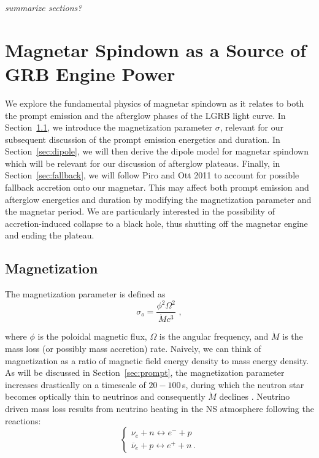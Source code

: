 \documentclass{article}
\begin{document}
\textit{summarize sections?}

\section{Magnetar Spindown as a Source of GRB Engine Power} 
We explore the fundamental physics of magnetar spindown as it relates to both the prompt emission and the afterglow phases of the LGRB light curve. In Section~\ref{sec:magnetization}, we introduce the magnetization parameter $\sigma$, relevant for our subsequent discussion of the prompt emission energetics and duration. In Section~\ref{sec:dipole}, we will then derive the dipole model for magnetar spindown which will be relevant for our discussion of afterglow plateaus. Finally, in Section~\ref{sec:fallback}, we will follow Piro and Ott 2011 \cite{Piro:2011ed} to account for possible fallback accretion onto our magnetar. This may affect both prompt emission and afterglow energetics and duration by modifying the magnetization parameter and the magnetar period.  We are particularly interested in the possibility of accretion-induced collapse to a black hole, thus shutting off the magnetar engine and ending the plateau.

\subsection{Magnetization} \label{sec:magnetization}

The magnetization parameter is defined as
\begin{equation}
\sigma_o= \frac{\phi^2 \Omega^2}{\dot{M} c^3}\,\,,
\end{equation}

where $\phi$ is the poloidal  magnetic flux, $\Omega$ is the angular frequency, and $\dot{M}$ is the mass loss (or possibly mass accretion) rate. Naively, we can think of magnetization as a ratio of magnetic field energy density to mass energy density. As will be discussed in Section~\ref{sec:prompt}, the magnetization parameter increases drastically on a timescale of $20-100$\,s, during which the neutron star becomes optically thin to neutrinos and consequently $\dot{M}$ declines \cite{Metzger:2010pp}. Neutrino driven mass loss results from neutrino heating in the NS atmosphere following the reactions:
\begin{equation}
\begin{cases}
\nu_e+ n \leftrightarrow e^- + p \\ \overline{\nu}_e+p \leftrightarrow e^+ + n \,.
\end{cases}
\end{equation}
\end{document}
